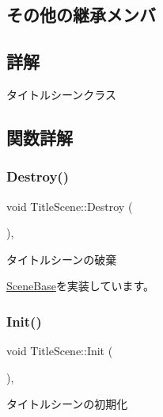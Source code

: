 \subsection*{その他の継承メンバ}


\subsection{詳解}
タイトルシーンクラス 

\subsection{関数詳解}
\mbox{\label{class_title_scene_adfbc5f934572ede2e36419b089c88fe8}} 
\subsubsection{\texorpdfstring{Destroy()}{Destroy()}}
{\footnotesize\ttfamily void Title\+Scene\+::\+Destroy (\begin{DoxyParamCaption}{ }\end{DoxyParamCaption})\hspace{0.3cm}{\ttfamily [final]}, {\ttfamily [virtual]}}



タイトルシーンの破棄 



\mbox{\hyperlink{class_scene_base_a7c5b54020bc519b4dadfe9770d6b27f7}{Scene\+Base}}を実装しています。

\mbox{\label{class_title_scene_a3d039e7db0fa1e22e8c36d3cedfbd318}} 
\subsubsection{\texorpdfstring{Init()}{Init()}}
{\footnotesize\ttfamily void Title\+Scene\+::\+Init (\begin{DoxyParamCaption}{ }\end{DoxyParamCaption})\hspace{0.3cm}{\ttfamily [final]}, {\ttfamily [virtual]}}



タイトルシーンの初期化 



